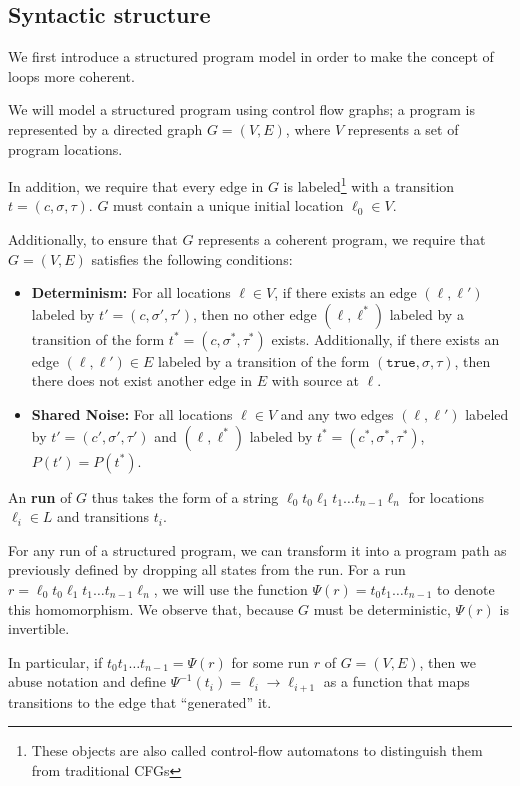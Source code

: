 
\subsection{Syntactic structure}

We first introduce a structured program model in order to make the concept of loops more coherent. 

We will model a structured program  using control flow graphs; a program is represented by a directed graph $G = (V, E)$, where $V$ represents a set of program locations. 

In addition, we require that every edge in $G$ is labeled\footnote{These objects are also called control-flow automatons to distinguish them from traditional CFGs} with a transition $t = (c, \sigma, \tau)$. $G$ must contain a unique initial location $\ell_0 \in V$.

Additionally, to ensure that $G$ represents a coherent program, we require that $G = (V, E)$ satisfies the following conditions: 
\begin{itemize}
    \item \textbf{Determinism:} For all locations $\ell\in V$, if there exists an edge $(\ell, \ell')$ labeled by $t'=(c, \sigma', \tau')$, then no other edge $(\ell, \ell^*)$ labeled by a transition of the form $t^* = (c, \sigma^*, \tau^*)$ exists. 
    Additionally, if there exists an edge $(\ell, \ell')\in E$ labeled by a transition of the form $(\texttt{true}, \sigma, \tau)$, then there does not exist another edge in $E$ with source at $\ell$.
    \item \textbf{Shared Noise:} For all locations $\ell\in V$ and any two edges $(\ell, \ell')$ labeled by $t'=(c', \sigma', \tau')$ and $(\ell, \ell^*)$ labeled by $t^* = (c^*, \sigma^*, \tau^*)$, $P(t') = P(t^*)$. 
\end{itemize}

An \textbf{run} of $G$ thus takes the form of a string $\ell_0t_0\ell_1t_1\ldots t_{n-1}\ell_n$ for locations $\ell_i\in L$ and transitions $t_i$.

For any run of a structured program, we can transform it into a program path as previously defined by dropping all states from the run. For a run $r=\ell_0t_0\ell_1t_1\ldots t_{n-1}\ell_n$, we will use the function $\Psi(r) = t_0t_1\ldots t_{n-1}$ to denote this homomorphism. We observe that, because $G$ must be deterministic, $\Psi(r)$ is invertible. 

In particular, if $t_0t_1\ldots t_{n-1} = \Psi(r)$ for some run $r$ of $G = (V, E)$, then we abuse notation and define $\Psi^{-1}(t_i) = \ell_i\to\ell_{i+1}$ as a function that maps transitions to the edge that ``generated'' it. 


